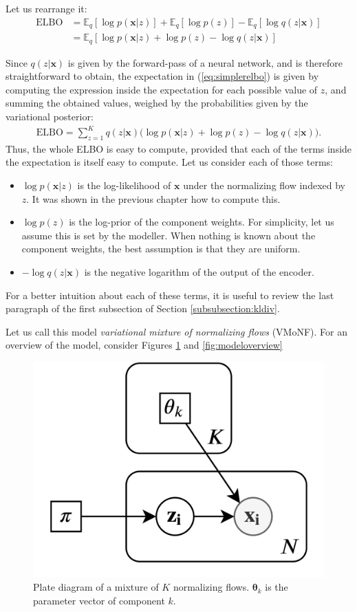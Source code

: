 Let us rearrange it:
\begin{align}
    \text{ELBO} &= \mathbb{E}_q [\log p(\bm{x}|z)] + \mathbb{E}_q [\log p(z)] - \mathbb{E}_q [\log q(z|\bm{x})]
        \label{eq:threepartelbo} \\
    &= \mathbb{E}_q [\log p(\bm{x}|z) + \log p(z) - \log q(z|\bm{x})] \label{eq:simplerelbo}
\end{align}

Since $q(z|\bm{x})$ is given by the forward-pass of a neural network, and is therefore
straightforward to obtain, the expectation in (\ref{eq:simplerelbo}) is given by
computing the expression inside the expectation for each possible value of $z$,
and summing the obtained values, weighed by the probabilities given by the variational posterior:
\begin{align}
    \text{ELBO} = \sum_{z=1}^K q(z|\bm{x})\big(\log p(\bm{x}|z) + \log p(z) - \log q(z|\bm{x})\big).
\end{align}
Thus, the whole ELBO is easy to compute, provided that each of the terms inside
the expectation is itself easy to compute. Let us consider each of those terms:
\begin{itemize}
    \item $\log p(\bm{x}|z)$ is the log-likelihood of $\bm{x}$ under the normalizing
        flow indexed by $z$. It was shown in the previous chapter how to compute
        this.
    \item $\log p(z)$ is the log-prior of the component weights. For simplicity,
        let us assume this is set by the modeller. When nothing is known about
        the component weights, the best assumption is that they are uniform.
    \item $- \log q(z|\bm{x})$ is the negative logarithm of the output of the encoder.
\end{itemize}

For a better intuition about each of these terms, it is useful to review the last
paragraph of the first subsection of Section \ref{subsubsection:kldiv}.

Let us call this model \emph{variational mixture of normalizing flows} (VMoNF). For an overview of
the model, consider Figures \ref{fig:plate} and \ref{fig:modeloverview}

\begin{figure}[!htb]
  \centering
  \includegraphics[width=0.5\linewidth]{figures/plate_diagram.png}
  \caption{Plate diagram of a mixture of $K$ normalizing flows. $\bm\theta_k$ is the
    parameter vector of component $k$.}
  \label{fig:plate}
\end{figure}

